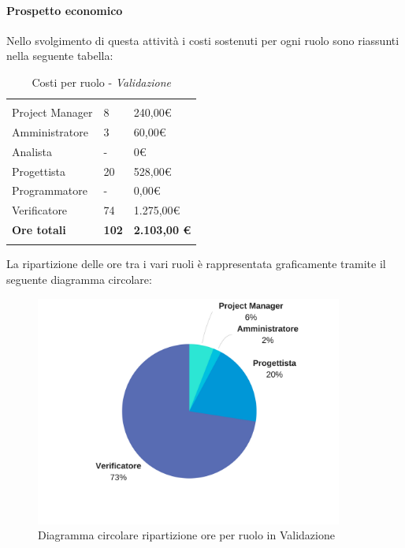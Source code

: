 			\paragraph{Prospetto economico}	\Spazio
			Nello svolgimento di questa attività i costi sostenuti per ogni ruolo sono riassunti nella seguente tabella:
			\begin{table}[H]
				\centering
				\begin{tabular}{|p{4cm}|C{4cm}|C{4cm}|}
					
					 & &\\
					Project Manager & 8 & 240,00\euro \\
					\hline
					Amministratore& 3 & 60,00\euro \\
					\hline
					Analista & - & 0\euro \\
					\hline
					Progettista & 20 & 528,00\euro \\
					\hline
					Programmatore & - & 0,00\euro \\
					\hline
					Verificatore & 74 & 1.275,00\euro \\
					\hline
					\textbf{Ore totali} & \textbf{102} & \textbf{2.103,00 \euro} \\
				\end{tabular}
				\caption{Costi per ruolo - \textit{Validazione}}
			\end{table}
			
			La ripartizione delle ore tra i vari ruoli è rappresentata graficamente tramite il seguente diagramma circolare:
			\begin{figure}[H] 
				\centering 
				\includegraphics[width=0.9\textwidth]{images/CircolareValidazione.png} 
				\caption{Diagramma circolare ripartizione ore per ruolo in Validazione}
				\label{CircolareValidazione}
			\end{figure}
			
